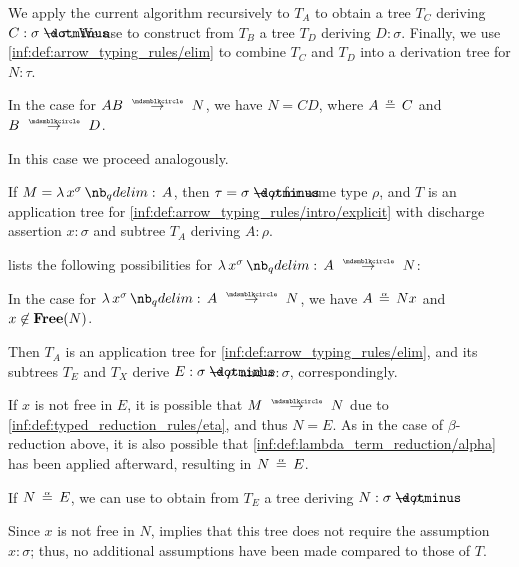 \begin{algorithm}
\begin{thmenum}
\begin{thmenum}
      We apply the current algorithm recursively to \( T_A \) to obtain a tree \( T_C \) deriving \( C: \sigma \synimplies \tau \). We use  to construct from \( T_B \) a tree \( T_D \) deriving \( D: \sigma \). Finally, we use \ref{inf:def:arrow_typing_rules/elim} to combine \( T_C \) and \( T_D \) into a derivation tree for \( N: \tau \).

       In the case  for \( A B \pred N \), we have \( N = CD \), where \( A \aequiv C \) and \( B \pred D \).

      In this case we proceed analogously.
    \end{thmenum}

     If \( M = \qabs {x^\sigma} A \), then \( \tau = \sigma \synimplies \rho \) for some type \( \rho \), and \( T \) is an application tree for \ref{inf:def:arrow_typing_rules/intro/explicit} with discharge assertion \( x: \sigma \) and subtree \( T_A \) deriving \( A: \rho \).

     lists the following possibilities for \( \qabs {x^\sigma} A \pred N \):
    \begin{thmenum}
       In the case  for \( \qabs {x^\sigma} A \pred N \), we have \( A \aequiv Nx \) and \( x \not\in \op*{Free}(N) \).

      Then \( T_A \) is an application tree for \ref{inf:def:arrow_typing_rules/elim}, and its subtrees \( T_E \) and \( T_X \) derive \( E: \sigma \synimplies \rho \) and \( x: \sigma \), correspondingly.

      If \( x \) is not free in \( E \), it is possible that \( M \pred N \) due to \ref{inf:def:typed_reduction_rules/eta}, and thus \( N = E \). As in the case of \( \beta \)-reduction above, it is also possible that \ref{inf:def:lambda_term_reduction/alpha} has been applied afterward, resulting in \( N \aequiv E \).

      If \( N \aequiv E \), we can use  to obtain from \( T_E \) a tree deriving \( N: \sigma \synimplies \rho \).

      Since \( x \) is not free in \( N \),  implies that this tree does not require the assumption \( x: \sigma \); thus, no additional assumptions have been made compared to those of \( T \).


\end{thmenum}
\end{thmenum}
\end{algorithm}
